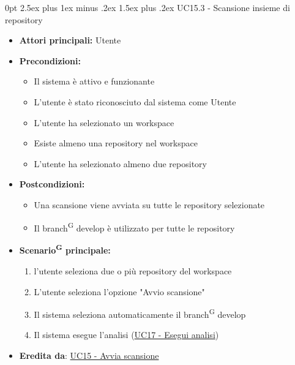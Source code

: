 \documentclass[a4paper, 11pt]{article}
\makeatletter
\renewcommand\paragraph{\@startsection{paragraph}{4}
  {0pt}
  {2.5ex plus 1ex minus .2ex}
  {1.5ex plus .2ex}
  {\normalfont\normalsize\bfseries\color{AccentDark}}}
\makeatother
\begin{document}
\paragraph{UC15.3 - Scansione insieme di repository} \label{UC15.3}
\begin{itemize}
	\item \textbf{Attori principali:} Utente
	\item \textbf{Precondizioni:}
	\begin{itemize}
		\item Il sistema è attivo e funzionante
		\item L'utente è stato riconosciuto dal sistema come Utente
		\item L'utente ha selezionato un workspace
		\item Esiste almeno una repository nel workspace
		\item L'utente ha selezionato almeno due repository 
	\end{itemize}
	\item \textbf{Postcondizioni:} 
	\begin{itemize}
		\item Una scansione viene avviata su tutte le repository selezionate
		\item Il branch\textsuperscript{G} develop è utilizzato per tutte le repository
	\end{itemize}
	\item \textbf{Scenario\textsuperscript{G} principale:}
	\begin{enumerate}
		\item l'utente seleziona due o più repository del workspace
		\item L'utente seleziona l'opzione "Avvio scansione"
		\item Il sistema seleziona automaticamente il branch\textsuperscript{G} develop
		\item Il sistema esegue l'analisi (\hyperref[UC17]{UC17 - Esegui analisi}) 
	\end{enumerate}
	\item \textbf{Eredita da}: \hyperref[UC15]{UC15 - Avvia scansione}
\end{itemize}
\end{document}
